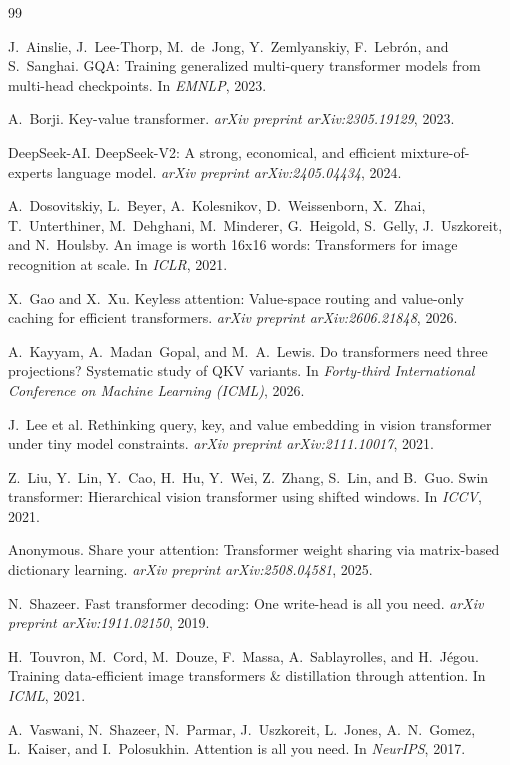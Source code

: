 \documentclass[11pt]{article}
\begin{document}

\begin{thebibliography}{99}

J.~Ainslie, J.~Lee-Thorp, M.~de~Jong, Y.~Zemlyanskiy, F.~Lebr\'on, and S.~Sanghai.
\newblock GQA: Training generalized multi-query transformer models from multi-head checkpoints.
\newblock In \emph{EMNLP}, 2023.

A.~Borji.
\newblock Key-value transformer.
\newblock \emph{arXiv preprint arXiv:2305.19129}, 2023.

DeepSeek-AI.
\newblock DeepSeek-V2: A strong, economical, and efficient mixture-of-experts language model.
\newblock \emph{arXiv preprint arXiv:2405.04434}, 2024.

A.~Dosovitskiy, L.~Beyer, A.~Kolesnikov, D.~Weissenborn, X.~Zhai, T.~Unterthiner, M.~Dehghani, M.~Minderer, G.~Heigold, S.~Gelly, J.~Uszkoreit, and N.~Houlsby.
\newblock An image is worth 16x16 words: Transformers for image recognition at scale.
\newblock In \emph{ICLR}, 2021.

X.~Gao and X.~Xu.
\newblock Keyless attention: Value-space routing and value-only caching for efficient transformers.
\newblock \emph{arXiv preprint arXiv:2606.21848}, 2026.

A.~Kayyam, A.~Madan~Gopal, and M.~A.~Lewis.
\newblock Do transformers need three projections? Systematic study of QKV variants.
\newblock In \emph{Forty-third International Conference on Machine Learning (ICML)}, 2026.

J.~Lee et al.
\newblock Rethinking query, key, and value embedding in vision transformer under tiny model constraints.
\newblock \emph{arXiv preprint arXiv:2111.10017}, 2021.

Z.~Liu, Y.~Lin, Y.~Cao, H.~Hu, Y.~Wei, Z.~Zhang, S.~Lin, and B.~Guo.
\newblock Swin transformer: Hierarchical vision transformer using shifted windows.
\newblock In \emph{ICCV}, 2021.

Anonymous.
\newblock Share your attention: Transformer weight sharing via matrix-based dictionary learning.
\newblock \emph{arXiv preprint arXiv:2508.04581}, 2025.

N.~Shazeer.
\newblock Fast transformer decoding: One write-head is all you need.
\newblock \emph{arXiv preprint arXiv:1911.02150}, 2019.

H.~Touvron, M.~Cord, M.~Douze, F.~Massa, A.~Sablayrolles, and H.~J\'egou.
\newblock Training data-efficient image transformers \& distillation through attention.
\newblock In \emph{ICML}, 2021.

A.~Vaswani, N.~Shazeer, N.~Parmar, J.~Uszkoreit, L.~Jones, A.~N.~Gomez, L.~Kaiser, and I.~Polosukhin.
\newblock Attention is all you need.
\newblock In \emph{NeurIPS}, 2017.

\end{thebibliography}
\end{document}

